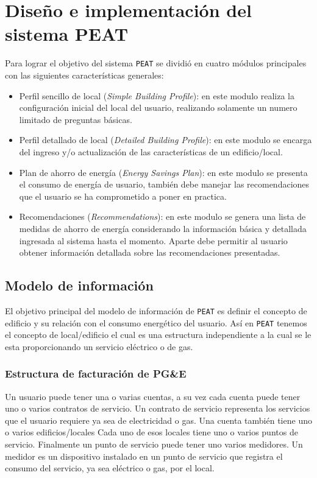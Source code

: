\chapter{Diseño e implementación del sistema PEAT}

Para lograr el objetivo del sistema \texttt{PEAT} se dividió en cuatro
módulos principales con las siguientes características generales:

\begin{itemize}
\item Perfil sencillo de local (\textit{Simple Building Profile}): en este modulo realiza
  la configuración inicial del local del usuario, realizando solamente un numero limitado
  de preguntas básicas.
\item Perfil detallado de local (\textit{Detailed Building Profile}): en este modulo se
  encarga del ingreso y/o actualización de las características de un edificio/local.
\item Plan de ahorro de energía (\textit{Energy Savings Plan}): en este modulo se
  presenta el consumo de energía de usuario, también debe manejar las recomendaciones
  que el usuario se ha comprometido a poner en practica.
\item Recomendaciones (\textit{Recommendations}): en este modulo se genera una lista
  de medidas de ahorro de energía considerando la información básica y detallada
  ingresada al sistema hasta el momento. Aparte debe permitir al usuario obtener
  información detallada sobre las recomendaciones presentadas.
\end{itemize}

\section{Modelo de información}

El objetivo principal del modelo de información de \texttt{PEAT} es definir el
concepto de edificio y su relación con el consumo energético del usuario. Así en
\texttt{PEAT} tenemos el concepto de local/edificio el cual es una estructura
independiente a la cual se le esta proporcionando un servicio eléctrico o de gas.

\subsection{Estructura de facturación de PG\&E}
Un usuario puede tener una o varias cuentas, a su vez cada cuenta puede tener uno o varios
contratos de servicio. Un contrato de servicio representa los servicios que el usuario
requiere ya sea de electricidad o gas. Una cuenta también tiene uno o varios edificios/locales
Cada uno de esos locales tiene uno o varios puntos de servicio. Finalmente un punto de servicio
puede tener uno varios medidores. Un medidor es un dispositivo instalado en un punto de servicio
que registra el consumo del servicio, ya sea eléctrico o gas, por el local.

